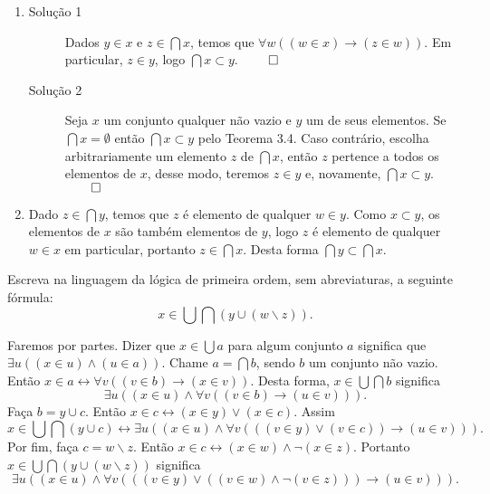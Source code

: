 \begin{enumerate}[label=(\alph{*})]
	\item
		\begin{description}
			\item[Solução 1] Dados $y\in x$ e $z\in\bigcap x$, temos que $\forall w((w\in x)\to(z\in w))$. Em particular, $z\in y$, logo $\bigcap x\subset y$. $\qed$
			\item[Solução 2] Seja $x$ um conjunto qualquer não vazio e $y$ um de seus elementos. Se $\bigcap x = \emptyset$ então $\bigcap x \subset y$ pelo Teorema 3.4. Caso contrário, escolha arbitrariamente um elemento $z$ de $\bigcap x$, então $z$ pertence a todos os elementos de $x$, desse modo, teremos $z \in y$ e, novamente, $\bigcap x \subset y$. $\qed$
		\end{description}
	\item Dado $z\in\bigcap y$, temos que $z$ é elemento de qualquer $w\in y$. Como $x\subset y$, os elementos de $x$ são também elementos de  $y$, logo $z$ é elemento de qualquer $w\in x$ em particular, portanto $z\in\bigcap x$. Desta forma $\bigcap y\subset\bigcap x$.
\end{enumerate}


\begin{exercicio}
	Escreva na linguagem da lógica de primeira ordem, sem abreviaturas, a seguinte fórmula:
	$$x\in\bigcup\bigcap(y\cup(w\backslash z)).$$
\end{exercicio}
\begin{solucao}
	Faremos por partes. Dizer que $x\in\bigcup a$ para algum conjunto $a$ significa que $\exists u((x\in u)\wedge(u\in a))$. Chame $a=\bigcap b$, sendo $b$ um conjunto não vazio. Então $x\in a\leftrightarrow\forall v((v\in b)\rightarrow(x\in v))$. Desta forma, $x\in \bigcup\bigcap b$ significa
	$$\exists u((x\in u)\wedge\forall v((v\in b)\rightarrow(u\in v))).$$
	Faça $b=y\cup c$. Então $x\in c\leftrightarrow(x\in y)\vee(x\in c)$. Assim
	$$x\in \bigcup\bigcap (y\cup c)\leftrightarrow\exists u((x\in u)\wedge\forall v(((v\in y)\vee(v\in c))\rightarrow(u\in v))).$$
	Por fim, faça $c=w\backslash z$. Então $x\in c\leftrightarrow(x\in w)\wedge\neg(x\in z)$. Portanto $x\in \bigcup\bigcap (y\cup(w\backslash z))$ significa
	$$\exists u((x\in u)\wedge\forall v(((v\in y)\vee((v\in w)\wedge\neg(v\in z)))\rightarrow(u\in v))).$$
\end{solucao}

